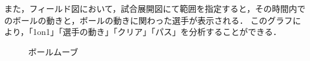 \documentclass[sotsuron]{kuee}
\begin{document}
				また，フィールド図において，試合展開図にて範囲を指定すると，その時間内でのボールの動きと，ボールの動きに関わった選手が表示される．
				このグラフにより，「1on1」「選手の動き」「クリア」「パス」を分析することができる．
					\begin{figure}
						\begin{center}
						\end{center}
						\caption{ボールムーブ}
				  		\label{fig:ballmove}
					\end{figure}
\end{document}

